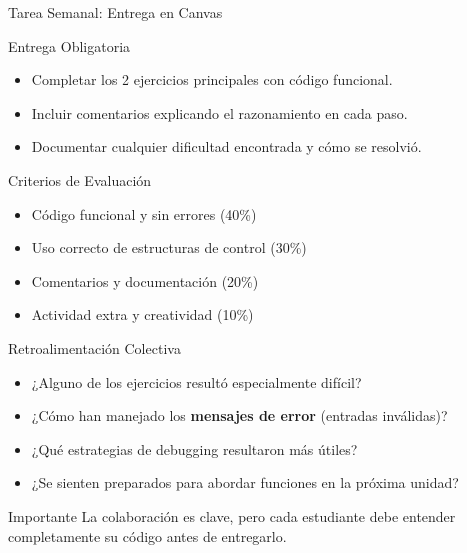 \documentclass[10pt]{beamer}
\begin{document}
\begin{frame}{Tarea Semanal: Entrega en Canvas}
  \begin{block}{Entrega Obligatoria}
    \begin{itemize}
      \item Completar los 2 ejercicios principales con código funcional.
      \item Incluir comentarios explicando el razonamiento en cada paso.
      \item Documentar cualquier dificultad encontrada y cómo se resolvió.
    \end{itemize}
  \end{block}
  
  \begin{block}{Criterios de Evaluación}
    \begin{itemize}
      \item Código funcional y sin errores (40\%)
      \item Uso correcto de estructuras de control (30\%)
      \item Comentarios y documentación (20\%)
      \item Actividad extra y creatividad (10\%)
    \end{itemize}
  \end{block}
\end{frame}

\fi


\begin{frame}{Retroalimentación Colectiva}
  \begin{itemize}
    \item ¿Alguno de los ejercicios resultó especialmente difícil?
    \item ¿Cómo han manejado los \textbf{mensajes de error} (entradas inválidas)?
    \item ¿Qué estrategias de debugging resultaron más útiles?
    \item ¿Se sienten preparados para abordar funciones en la próxima unidad?
  \end{itemize}
  
  \begin{alertblock}{Importante}
    La colaboración es clave, pero cada estudiante debe entender completamente su código antes de entregarlo.
  \end{alertblock}
\end{frame}
\end{document}
